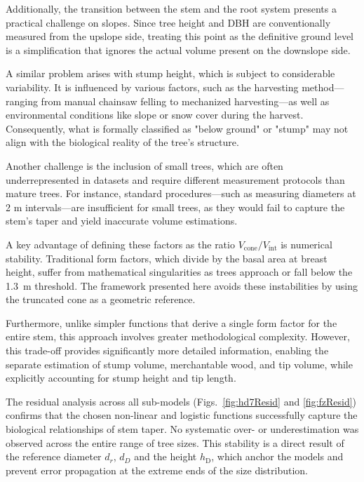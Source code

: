 \documentclass[twocolumn, bibliography=totoc]{scrartcl}
\begin{document}
Additionally, the transition between the stem and the root system presents a practical challenge on slopes. Since tree height and DBH are conventionally measured from the upslope side, treating this point as the definitive ground level is a simplification that ignores the actual volume present on the downslope side. 

A similar problem arises with stump height, which is subject to considerable variability. It is influenced by various factors, such as the harvesting method—ranging from manual chainsaw felling to mechanized harvesting—as well as environmental conditions like slope or snow cover during the harvest. Consequently, what is formally classified as "below ground" or "stump" may not align with the biological reality of the tree's structure.

Another challenge is the inclusion of small trees, which are often underrepresented in datasets and require different measurement protocols than mature trees. For instance, standard procedures—such as measuring diameters at 2 m intervals—are insufficient for small trees, as they would fail to capture the stem's taper and yield inaccurate volume estimations.

A key advantage of defining these factors as the ratio $V_{\text{cone}} / V_{\text{int}}$ is numerical stability. Traditional form factors, which divide by the basal area at breast height, suffer from mathematical singularities as trees approach or fall below the \qty{1.3}{m} threshold. The framework presented here avoids these instabilities by using the truncated cone as a geometric reference.

Furthermore, unlike simpler functions that derive a single form factor for the entire stem, this approach involves greater methodological complexity. However, this trade-off provides significantly more detailed information, enabling the separate estimation of stump volume, merchantable wood, and tip volume, while explicitly accounting for stump height and tip length.

The residual analysis across all sub-models (Figs.~\ref{fig:hd7Resid} and \ref{fig:fzResid}) confirms that the chosen non-linear and logistic functions successfully capture the biological relationships of stem taper. No systematic over- or underestimation was observed across the entire range of tree sizes. This stability is a direct result of the reference diameter $d_r$, $d_D$ and the height $h_{\text{D}}$, which anchor the models and prevent error propagation at the extreme ends of the size distribution.
\end{document}
